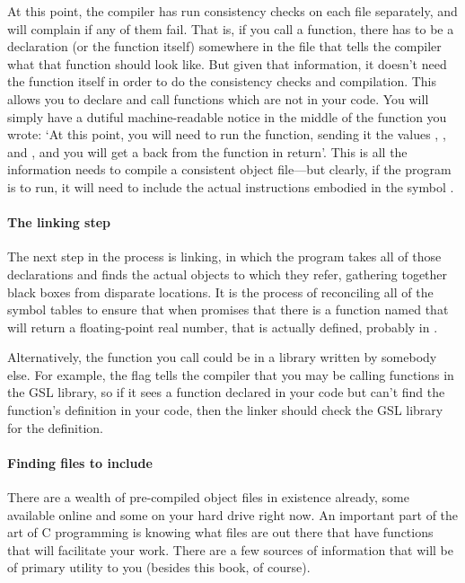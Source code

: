 \documentclass[12pt]{article}
\def\ind#1{\index{#1}#1}
\begin{document}
At this point, the compiler has run consistency checks on each file separately,
and will complain if any of them fail. That is, if you call a function,
there has to be a declaration (or the function itself) somewhere in the
file that tells the compiler what that function should look like. But 
given that information, it doesn't need the function itself in order to
do the consistency checks and compilation. This allows you to declare
and call functions which are not in your code. You will simply have a
dutiful machine-readable notice in the middle of the function you wrote:
`At this point, you will need to run the  function,
sending it the values , , and , and
you will get a  back from the function in return'. This is
all the information  needs to compile a consistent object file---but
clearly, if the program is to run, it will need to include the actual
instructions embodied in the symbol .

\paragraph{The \ind{linking} step}
The next step in the process is linking, in which the program takes all
of those declarations and finds the actual objects to which they
refer, gathering together black boxes from disparate locations. It
is the process of reconciling all of the symbol tables to ensure
that when  promises that there is a function named
 that will return a floating-point real
number, that  is actually defined,  probably
in .

Alternatively, the function you call could be in a library written by
somebody else.  For example, the  flag tells the compiler that
you may be calling functions in the GSL library, so if it sees a function
declared in your code but can't find the function's definition in your
code, then the linker should check the GSL library for the definition.


\paragraph{Finding files to include}
There are a wealth of pre-compiled object files in existence already,
some available online and some on your hard drive right now.  An
important part of the art of C programming is knowing what files are
out there that have functions that will facilitate your work. There
are a few sources of information that will be of primary utility to you
(besides this book, of course).
\end{document}
